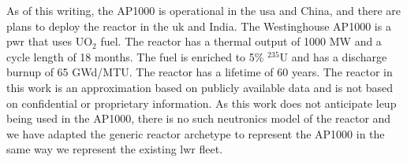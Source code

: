 As of this writing, the AP1000 is operational in the \gls{usa} and China, and there are plans to deploy the reactor in the \gls{uk} and India. The Westinghouse AP1000 is a \gls{pwr} that uses UO$_2$ fuel. The reactor has a thermal output of 1000 MW and a cycle length of 18 months. The fuel is enriched to 5\% $^{235}$U and has a discharge burnup of 65 GWd/MTU. The reactor has a lifetime of 60 years. The reactor in this work is an approximation based on publicly available data and is not based on confidential or proprietary information. As this work does not anticipate \gls{leup} being used in the AP1000, there is no such neutronics model of the reactor and we have adapted the generic \cycamore reactor archetype to represent the AP1000 in the same way we represent the existing \gls{lwr} fleet.
